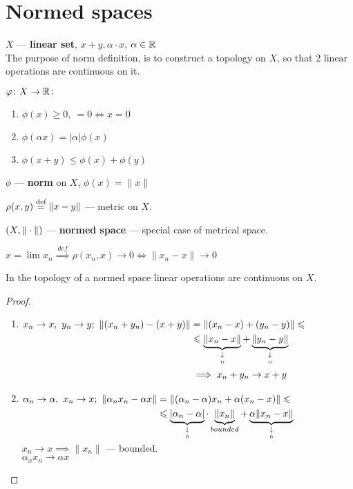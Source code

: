 \section{Normed spaces}
\begin{defn}
  $X$ --- \textbf{linear set}, $x + y, \alpha \cdot x$, $\alpha \in \mathbb{R}$ \\
  The purpose of norm definition, is to construct a topology on $X$, so that 2 linear operations are continuous on it.
\end{defn}

$\varphi\colon X \to \mathbb{R}\colon$
\begin{enumerate}
\item $\phi(x) \geq 0,\ = 0 \iff x = 0$
\item $\phi(\alpha x) = |\alpha| \phi(x)$
\item $\phi(x + y) \leq \phi(x) + \phi(y)$
\end{enumerate}

\begin{defn}
  $\phi$ --- \textbf{norm} on $X$, $\phi(x) = \|x\|$
\end{defn}

$\rho(x, y) \overset{\text{def}}{=} \|x - y\|$ --- metric on $X$.

\begin{defn}
  $\\(X, \|\cdot\|)$ --- \textbf{normed space} --- special case of metrical space.
\end{defn}

\noindent
$x = \lim x_n \overset{def}{\implies} \rho(x_n, x) \to 0 \iff \|x_n - x\| \to 0$

\begin{stm}
  In the topology of a normed space linear operations are continuous on $X$.
\end{stm}

\begin{proof}\leavevmode
  \begin{enumerate}
  \item
    $\begin{aligned}[t]
      x_n \to x,\ y_n \to y;\ \|(x_n + y_n) - (x + y)\| & = \|(x_n - x) + (y_n - y)\|  \leqslant \\
      & \leqslant  \underbrace{\|x_n - x\|}_{\underset{0}{\downarrow}} + \underbrace{\|y_n - y\|}_{\underset{0}{\downarrow}} \\
      & \implies x_n + y_n \to x + y
    \end{aligned}$
  \item
    $\begin{aligned}[t]
       \alpha_n \to \alpha,\ x_n \to x;\ \|\alpha_n x_n - \alpha x\| & =
        \|(\alpha_n - \alpha)x_n + \alpha(x_n - x)\| \leqslant \\
        & \leqslant \underbrace{|\alpha_n - \alpha|}_{\underset{0}{\downarrow}} \cdot \underbrace{\|x_n\|}_{bounded} + \underbrace{\alpha\|x_n - x\|}_{\underset{0}{\downarrow}}
    \end{aligned}$ \\
    $x_n \to x \implies \|x_n\|$ --- bounded. \\
    $\alpha_x x_n \to \alpha x$ \qedhere
  \end{enumerate}
\end{proof}


